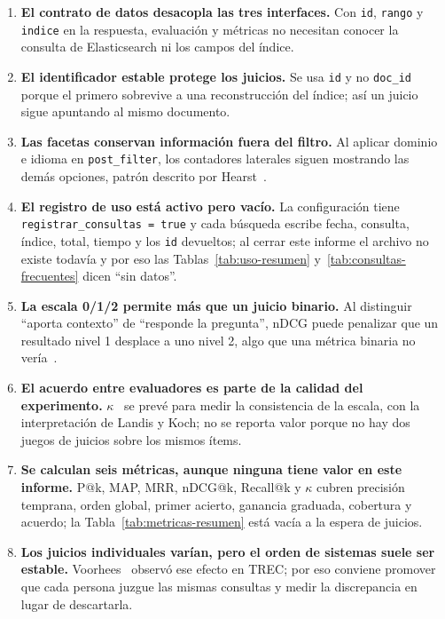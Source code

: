 \documentclass[11pt,spanish]{article}
\begin{document}
\begin{enumerate}[label=\textbf{C\arabic*}.]
  \item \textbf{El contrato de datos desacopla las tres interfaces.} Con
    \texttt{id}, \texttt{rango} y \texttt{indice} en la respuesta, evaluación y
    métricas no necesitan conocer la consulta de Elasticsearch ni los campos
    del índice.

  \item \textbf{El identificador estable protege los juicios.} Se usa
    \texttt{id} y no \texttt{doc\_id} porque el primero sobrevive a una
    reconstrucción del índice; así un juicio sigue apuntando al mismo documento.

  \item \textbf{Las facetas conservan información fuera del filtro.} Al aplicar
    dominio e idioma en \texttt{post\_filter}, los contadores laterales siguen
    mostrando las demás opciones, patrón descrito por Hearst~\cite{hearst2009}.

  \item \textbf{El registro de uso está activo pero vacío.} La configuración
    tiene \texttt{registrar\_consultas = true} y cada búsqueda escribe fecha,
    consulta, índice, total, tiempo y los \texttt{id} devueltos; al cerrar este
    informe el archivo no existe todavía y por eso las
    Tablas~\ref{tab:uso-resumen} y~\ref{tab:consultas-frecuentes} dicen ``sin
    datos''.

  \item \textbf{La escala 0/1/2 permite más que un juicio binario.} Al
    distinguir ``aporta contexto'' de ``responde la pregunta'', nDCG puede
    penalizar que un resultado nivel 1 desplace a uno nivel 2, algo que una
    métrica binaria no vería~\cite{jarvelin2002}.

  \item \textbf{El acuerdo entre evaluadores es parte de la calidad del
    experimento.} $\kappa$~\cite{cohen1960,landis1977} se prevé para medir la
    consistencia de la escala, con la interpretación de Landis y Koch; no se
    reporta valor porque no hay dos juegos de juicios sobre los mismos ítems.

  \item \textbf{Se calculan seis métricas, aunque ninguna tiene valor en este
    informe.} P@k, MAP, MRR, nDCG@k, Recall@k y $\kappa$ cubren precisión
    temprana, orden global, primer acierto, ganancia graduada, cobertura y
    acuerdo; la Tabla~\ref{tab:metricas-resumen} está vacía a la espera de
    juicios.

  \item \textbf{Los juicios individuales varían, pero el orden de sistemas
    suele ser estable.} Voorhees~\cite{voorhees2000} observó ese efecto en TREC;
    por eso conviene promover que cada persona juzgue las mismas consultas y
    medir la discrepancia en lugar de descartarla.


\end{enumerate}
\end{document}

